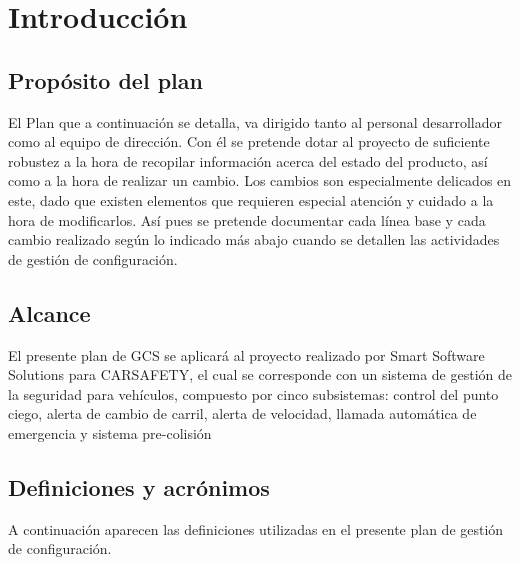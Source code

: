\section{Introducción}

\subsection{Propósito del plan}
El Plan que a continuación se detalla, va dirigido tanto al personal desarrollador como al equipo de dirección. Con él se pretende dotar al proyecto de suficiente robustez a la hora de recopilar información acerca del estado del producto, así como a la hora de realizar un cambio. Los cambios son especialmente delicados en este, dado que existen elementos que requieren especial atención y cuidado a la hora de modificarlos.
Así pues se pretende documentar cada línea base y cada cambio realizado según lo indicado más abajo cuando se detallen las actividades de gestión de configuración.

\subsection{Alcance}
El presente plan de GCS se aplicará al proyecto realizado por Smart Software Solutions para CARSAFETY, el cual se corresponde con un sistema de gestión de la seguridad para vehículos, compuesto por cinco subsistemas: control del punto ciego, alerta de cambio de carril, alerta de velocidad, llamada automática de emergencia y sistema pre-colisión

\subsection{Definiciones y acrónimos}
A continuación aparecen las definiciones utilizadas en el presente plan de gestión de configuración.

